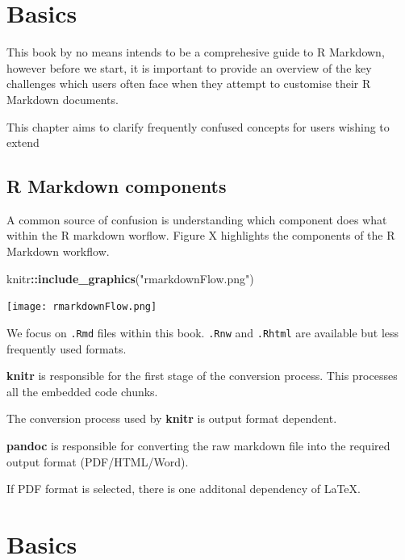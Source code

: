 \documentclass[]{book}
\newenvironment{Shaded}{\begin{snugshade}}{\end{snugshade}}
\newcommand{\KeywordTok}[1]{\textcolor[rgb]{0.13,0.29,0.53}{\textbf{#1}}}
\newcommand{\NormalTok}[1]{#1}
\newcommand{\OperatorTok}[1]{\textcolor[rgb]{0.81,0.36,0.00}{\textbf{#1}}}
\newcommand{\StringTok}[1]{\textcolor[rgb]{0.31,0.60,0.02}{#1}}
\theoremstyle{definition}
\theoremstyle{definition}
\theoremstyle{definition}
\theoremstyle{remark}
\begin{document}
\hypertarget{basics}{%
\chapter{Basics}\label{basics}}

This book by no means intends to be a comprehesive guide to R Markdown,
however before we start, it is important to provide an overview of the
key challenges which users often face when they attempt to customise
their R Markdown documents.

This chapter aims to clarify frequently confused concepts for users
wishing to extend

\hypertarget{r-markdown-components}{%
\section{R Markdown components}\label{r-markdown-components}}

A common source of confusion is understanding which component does what
within the R markdown worflow. Figure X highlights the components of the
R Markdown workflow.

\begin{Shaded}
\begin{Highlighting}[]
\NormalTok{knitr}\OperatorTok{::}\KeywordTok{include_graphics}\NormalTok{(}\StringTok{"rmarkdownFlow.png"}\NormalTok{)}
\end{Highlighting}
\end{Shaded}

\texttt{[image: rmarkdownFlow.png]}

We focus on \texttt{.Rmd} files within this book. \texttt{.Rnw} and
\texttt{.Rhtml} are available but less frequently used formats.

\textbf{knitr} is responsible for the first stage of the conversion
process. This processes all the embedded code chunks.

The conversion process used by \textbf{knitr} is output format
dependent.

\textbf{pandoc} is responsible for converting the raw markdown file into
the required output format (PDF/HTML/Word).

If PDF format is selected, there is one additonal dependency of LaTeX.

\hypertarget{basics-1}{%
\chapter{Basics}\label{basics-1}}
\end{document}
